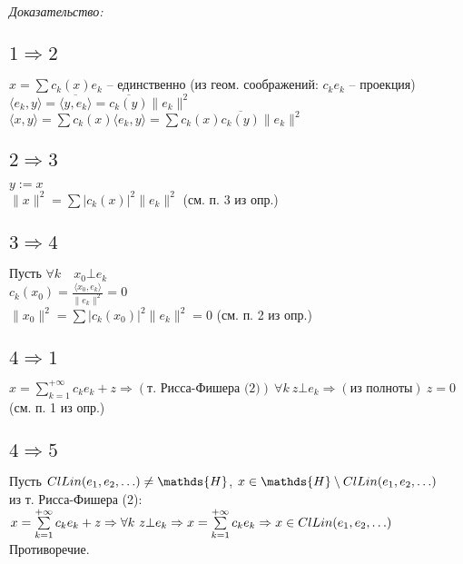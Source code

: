 \documentclass[paper=a4, fontsize=17pt]{article}
\begin{document}
\emph{Доказательство:}

\subsection{\texorpdfstring{$1 \Rightarrow 2$}{TEXT}}
$x=\sum c_k(x) e_k$ -- единственно (из геом. соображений: $c_k e_k$ -- проекция)\\
$\langle e_k, y \rangle = \overline{\langle y, e_k \rangle} = \overline{c_k(y)}\|e_k\|^2$\\
$\langle x, y \rangle = \sum c_k(x) \langle e_k, y \rangle = \sum c_k(x)\overline{c_k(y)}\|e_k\|^2$

\subsection{\texorpdfstring{$2 \Rightarrow 3$}{TEXT}}
$y:=x$\\
$\|x\|^2=\sum \vert c_k(x) \vert ^2 \|e_k\|^2$ (см. п. 3 из опр.)

\subsection{\texorpdfstring{$3 \Rightarrow 4$}{TEXT}}
Пусть $\forall k \quad x_0 \bot e_k$\\
$c_k(x_0)=\frac{\langle x_0, e_k \rangle}{\|e_k\|^2}=0$\\
$\|x_0\|^2=\sum \vert c_k(x_0) \vert^2 \|e_k\|^2 = 0$ (см. п. 2 из опр.)

\subsection{\texorpdfstring{$4 \Rightarrow 1$}{TEXT}}
$x =\sum\limits_{k=1}^{+\infty} c_k e_k + z \Rightarrow(\text{т. Рисса-Фишера (2)}) \  \forall k \ z \bot e_k \Rightarrow(\text{из полноты}) \ z = 0$ (см. п. 1 из опр.)

\subsection{\texorpdfstring{$4 \Rightarrow 5$}{TEXT}}
Пусть $Cl Lin(e_1, e_2, \mathellipsis) \ne \mathds{H}$, $x \in \mathds{H} \setminus Cl Lin(e_1, e_2, \mathellipsis)$\\
из т. Рисса-Фишера (2): $x =\sum\limits_{k=1}^{+\infty} c_k e_k + z \Rightarrow \forall k \ z \bot e_k \Rightarrow x =\sum\limits_{k=1}^{+\infty} c_k e_k \Rightarrow x \in Cl Lin(e_1, e_2, \mathellipsis)$\\
Противоречие.
\end{document}
